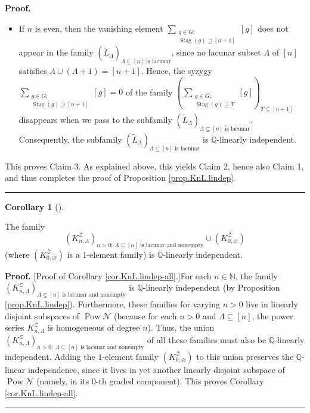 \documentclass[numbers=enddot,12pt,final,onecolumn,notitlepage]{scrartcl}%
\theoremstyle{definition}
\newtheorem{coro}[theo]{Corollary}
\newenvironment{corollary}[1][]
{\begin{coro}[#1]\begin{leftbar}}
{\end{leftbar}\end{coro}}
\newenvironment{proof}[1][Proof]{\noindent\textbf{#1.} }{\ \rule{0.5em}{0.5em}}
\let\sumnonlimits\sum
\renewcommand{\sum}{\sumnonlimits\limits}
\begin{document}
\begin{proof}
\begin{itemize}
\item If $n$ is even, then the vanishing element $\sum_{\substack{g\in
G;\\\operatorname*{Stag}\left(  g\right)  \supseteq\left[  n+1\right]
}}\left[  g\right]  $ does not appear in the family $\left(  \widetilde{L}%
_{\Lambda}\right)  _{\Lambda\subseteq\left[  n\right]  \text{ is lacunar}}$,
since no lacunar subset $\Lambda$ of $\left[  n\right]  $ satisfies
$\Lambda\cup\left(  \Lambda+1\right)  =\left[  n+1\right]  $. Hence, the
syzygy $\sum_{\substack{g\in G;\\\operatorname*{Stag}\left(  g\right)
\supseteq\left[  n+1\right]  }}\left[  g\right]  =0$ of the family $\left(
\sum_{\substack{g\in G;\\\operatorname*{Stag}\left(  g\right)  \supseteq
T}}\left[  g\right]  \right)  _{T\subseteq\left[  n+1\right]  }$ disappears
when we pass to the subfamily $\left(  \widetilde{L}_{\Lambda}\right)
_{\Lambda\subseteq\left[  n\right]  \text{ is lacunar}}$. Consequently, the
subfamily $\left(  \widetilde{L}_{\Lambda}\right)  _{\Lambda\subseteq\left[
n\right]  \text{ is lacunar}}$ is $\mathbb{Q}$-linearly independent.
\end{itemize}

This proves Claim 3. As explained above, this yields Claim 2, hence also Claim
1, and thus completes the proof of Proposition \ref{prop.KnL.lindep}.
\end{proof}

\begin{corollary}
\label{cor.KnL.lindep-all}The family%
\[
\left(  K_{n,\Lambda}^{\mathcal{Z}}\right)  _{n>0;\ \Lambda\subseteq\left[
n\right]  \text{ is lacunar and nonempty}}\cup\left(  K_{0,\varnothing
}^{\mathcal{Z}}\right)
\]
(where $\left(  K_{0,\varnothing}^{\mathcal{Z}}\right)  $ is a $1$-element
family) is $\mathbb{Q}$-linearly independent.
\end{corollary}

\begin{proof}
[Proof of Corollary \ref{cor.KnL.lindep-all}.]For each $n\in\mathbb{N}$, the
family $\left(  K_{n,\Lambda}^{\mathcal{Z}}\right)  _{\Lambda\subseteq\left[
n\right]  \text{ is lacunar and nonempty}}$ is $\mathbb{Q}$-linearly
independent (by Proposition \ref{prop.KnL.lindep}). Furthermore, these
families for varying $n>0$ live in linearly disjoint subspaces of
$\operatorname*{Pow}\mathcal{N}$ (because for each $n>0$ and $\Lambda
\subseteq\left[  n\right]  $, the power series $K_{n,\Lambda}^{\mathcal{Z}}$
is homogeneous of degree $n$). Thus, the union $\left(  K_{n,\Lambda
}^{\mathcal{Z}}\right)  _{n>0;\ \Lambda\subseteq\left[  n\right]  \text{ is
lacunar and nonempty}}$ of all these families must also be $\mathbb{Q}%
$-linearly independent. Adding the $1$-element family $\left(
K_{0,\varnothing}^{\mathcal{Z}}\right)  $ to this union preserves the
$\mathbb{Q}$-linear independence, since it lives in yet another linearly
disjoint subspace of $\operatorname*{Pow}\mathcal{N}$ (namely, in its $0$-th
graded component). This proves Corollary \ref{cor.KnL.lindep-all}.
\end{proof}
\end{document}
